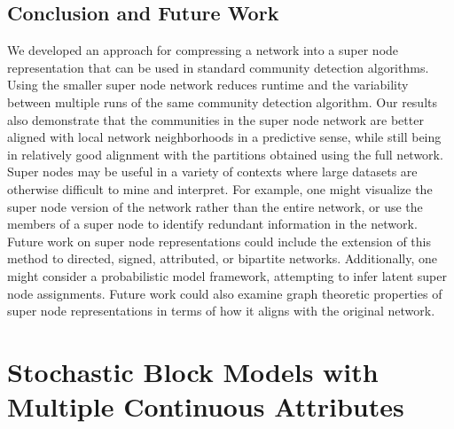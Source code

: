 \section{Conclusion and Future Work}
\indent We developed an approach for compressing a network into a super node representation that can be used in standard community detection algorithms. Using the smaller super node network reduces runtime and the variability between multiple runs of the same community detection algorithm. Our results also demonstrate that the communities in the super node network are better aligned with local network neighborhoods in a predictive sense, while still being in relatively good alignment with the partitions obtained using the full network. \\
\indent Super nodes may be useful in a variety of contexts where large datasets are otherwise difficult to mine and interpret. For example, one might visualize the super node version of the network rather than the entire network, or use the members of a super node to identify redundant information in the network. Future work on super node representations could include the extension of this method to directed, signed, attributed, or bipartite networks. Additionally, one might consider a probabilistic model framework, attempting to infer latent super node assignments. 
Future work could also examine graph theoretic properties of super node representations in terms of how it aligns with the original network. 

\chapter{Stochastic Block Models with Multiple Continuous Attributes}

\noindent{}


